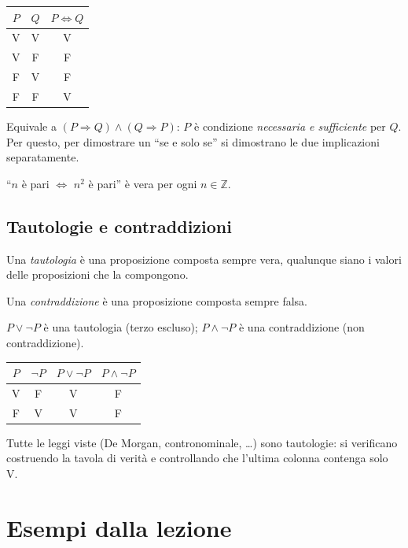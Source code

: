 \documentclass[11pt,a4paper]{article}
\newcommand{\V}{\textsf{V}}
\newcommand{\F}{\textsf{F}}
\begin{document}
\begin{center}
\begin{tabular}{cc|c}
$P$ & $Q$ & $P \Leftrightarrow Q$ \\ \hline
\V & \V & \V \\
\V & \F & \F \\
\F & \V & \F \\
\F & \F & \V
\end{tabular}
\end{center}

Equivale a $(P \Rightarrow Q) \land (Q \Rightarrow P)$: $P$ è condizione
\emph{necessaria e sufficiente} per $Q$. Per questo, per dimostrare un
``se e solo se'' si dimostrano le due implicazioni separatamente.

\begin{esempio}
``$n$ è pari $\Leftrightarrow$ $n^2$ è pari'' è vera per ogni
$n \in \mathbb{Z}$.
\end{esempio}

\subsection{Tautologie e contraddizioni}

\begin{definizione}
Una \emph{tautologia} è una proposizione composta sempre vera, qualunque
siano i valori delle proposizioni che la compongono.

Una \emph{contraddizione} è una proposizione composta sempre falsa.
\end{definizione}

\begin{esempio}
$P \lor \neg P$ è una tautologia (terzo escluso);
$P \land \neg P$ è una contraddizione (non contraddizione).
\begin{center}
\begin{tabular}{c|c|c|c}
$P$ & $\neg P$ & $P \lor \neg P$ & $P \land \neg P$ \\ \hline
\V & \F & \V & \F \\
\F & \V & \V & \F
\end{tabular}
\end{center}
\end{esempio}

Tutte le leggi viste (De Morgan, contronominale, \dots) sono tautologie: si
verificano costruendo la tavola di verità e controllando che l'ultima
colonna contenga solo \V.


\section{Esempi dalla lezione}
\end{document}
